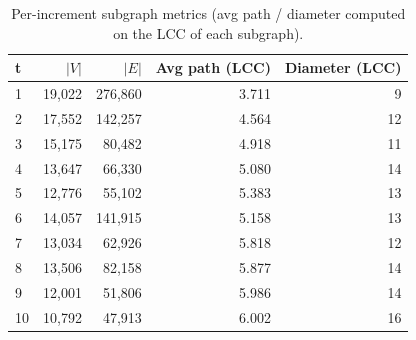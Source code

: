 \begin{table}[t]
\centering
\caption{Per-increment subgraph metrics (avg path / diameter computed on the LCC of each subgraph).}
\label{tab:time-sub}
\begin{tabular}{lrrrr}
\toprule
t & $|V|$ & $|E|$ & Avg path (LCC) & Diameter (LCC) \\
\midrule
1 & 19,022 & 276,860 & 3.711 & 9 \\
2 & 17,552 & 142,257 & 4.564 & 12 \\
3 & 15,175 & 80,482 & 4.918 & 11 \\
4 & 13,647 & 66,330 & 5.080 & 14 \\
5 & 12,776 & 55,102 & 5.383 & 13 \\
6 & 14,057 & 141,915 & 5.158 & 13 \\
7 & 13,034 & 62,926 & 5.818 & 12 \\
8 & 13,506 & 82,158 & 5.877 & 14 \\
9 & 12,001 & 51,806 & 5.986 & 14 \\
10 & 10,792 & 47,913 & 6.002 & 16 \\
\bottomrule
\end{tabular}
\end{table}

